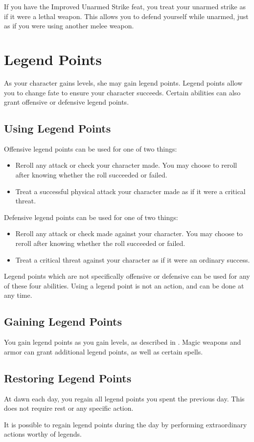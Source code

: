 If you have the Improved Unarmed Strike feat, you treat your unarmed strike as if it were a lethal weapon. This allows you to defend yourself while unarmed, just as if you were using another melee weapon.
\section{Legend Points}\label{Legend Points}

As your character gains levels, she may gain legend points. Legend points allow you to change fate to ensure your character succeeds. Certain abilities can also grant offensive or defensive legend points.

\subsection{Using Legend Points}

Offensive legend points can be used for one of two things:
\begin{itemize}
    \item Reroll any attack or check your character made. You may choose to reroll after knowing whether the roll succeeded or failed.
    \item Treat a successful physical attack your character made as if it were a critical threat.
\end{itemize}

Defensive legend points can be used for one of two things:
\begin{itemize}
    \item Reroll any attack or check made against your character. You may choose to reroll after knowing whether the roll succeeded or failed.
    \item Treat a critical threat against your character as if it were an ordinary success.
\end{itemize}

Legend points which are not specifically offensive or defensive can be used for any of these four abilities. Using a legend point is not an action, and can be done at any time.

\subsection{Gaining Legend Points}

You gain legend points as you gain levels, as described in .
Magic weapons and armor can grant additional legend points, as well as certain spells.

\subsection{Restoring Legend Points}

At dawn each day, you regain all legend points you spent the previous day. This does not require rest or any specific action.

It is possible to regain legend points during the day by performing extraordinary actions worthy of legends.
